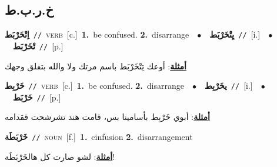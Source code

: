 \documentclass[10pt,a4paper,twoside]{article} %
\begin{document}
\begin{multicols}{2}
{{{{{{{{{{{\vspace{-3mm}
\subsection*{\color{blue}\foreignlanguage{arabic}{خ.ر.ب.ط}\color{blue}{}} 

{\setlength\topsep{0pt}\textbf{\foreignlanguage{arabic}{اِتْخَرْبَط}}\ {\color{gray}\texttt{//}\color{black}}\ \textsc{verb}\ [c.]\ \textbf{1.}~be confused.  \textbf{2.}~disarrange\ \ $\bullet$\ \ \setlength\topsep{0pt}\textbf{\foreignlanguage{arabic}{يِتْخَرْبَط}}\ {\color{gray}\texttt{//}\color{black}}\ [i.]\ \ $\bullet$\ \ \setlength\topsep{0pt}\textbf{\foreignlanguage{arabic}{تْخَرْبَط}}\ {\color{gray}\texttt{//}\color{black}}\ [p.]\  \begin{flushright}\color{gray}\foreignlanguage{arabic}{\textbf{\underline{\foreignlanguage{arabic}{أمثلة}}}: أوعك تِتْخَرْبَط باسم مرتك ولا والله بتفلق وجهك}\end{flushright}\color{black}} \vspace{2mm}

{\setlength\topsep{0pt}\textbf{\foreignlanguage{arabic}{خَرْبِط}}\ {\color{gray}\texttt{//}\color{black}}\ \textsc{verb}\ [c.]\ \textbf{1.}~be confused.  \textbf{2.}~disarrange\ \ $\bullet$\ \ \setlength\topsep{0pt}\textbf{\foreignlanguage{arabic}{يخَرْبِط}}\ {\color{gray}\texttt{//}\color{black}}\ [i.]\ \ $\bullet$\ \ \setlength\topsep{0pt}\textbf{\foreignlanguage{arabic}{خَرْبَط}}\ {\color{gray}\texttt{//}\color{black}}\ [p.]\  \begin{flushright}\color{gray}\foreignlanguage{arabic}{\textbf{\underline{\foreignlanguage{arabic}{أمثلة}}}: أبوي خَرْبِط بأسامينا بس، قامت هند تشرشحت ققدامه}\end{flushright}\color{black}} \vspace{2mm}

{\setlength\topsep{0pt}\textbf{\foreignlanguage{arabic}{خَرْبَطَة}}\ {\color{gray}\texttt{//}\color{black}}\ \textsc{noun}\ [f.]\ \textbf{1.}~cinfusion  \textbf{2.}~disarrangement\  \begin{flushright}\color{gray}\foreignlanguage{arabic}{\textbf{\underline{\foreignlanguage{arabic}{أمثلة}}}: لشو صارت كل هالخَرْبَطَة!}\end{flushright}\color{black}} \vspace{2mm}

}}}}}}}}}}}
\end{multicols}
\end{document}
